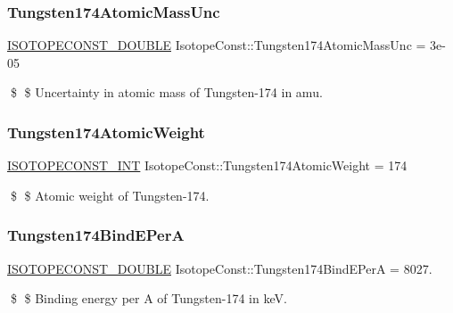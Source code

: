 \subsubsection{\texorpdfstring{Tungsten174\+Atomic\+Mass\+Unc}{Tungsten174AtomicMassUnc}}
{\footnotesize\ttfamily \mbox{\hyperlink{group___isotope_const-_macros_ga8f45a7272ce02c0b4c65c44636ed719a}{I\+S\+O\+T\+O\+P\+E\+C\+O\+N\+S\+T\+\_\+\+D\+O\+U\+B\+LE}} Isotope\+Const\+::\+Tungsten174\+Atomic\+Mass\+Unc = 3e-\/05}

\$ \$ Uncertainty in atomic mass of Tungsten-\/174 in amu. \mbox{\label{group___isotope_const-_tungsten-_w174_ga7711e9fd1b9ef472b4cac411e35f0bcd}} 
\subsubsection{\texorpdfstring{Tungsten174\+Atomic\+Weight}{Tungsten174AtomicWeight}}
{\footnotesize\ttfamily \mbox{\hyperlink{group___isotope_const-_macros_ga5f18360b3e99483a35c32d789e62621c}{I\+S\+O\+T\+O\+P\+E\+C\+O\+N\+S\+T\+\_\+\+I\+NT}} Isotope\+Const\+::\+Tungsten174\+Atomic\+Weight = 174}

\$ \$ Atomic weight of Tungsten-\/174. \mbox{\label{group___isotope_const-_tungsten-_w174_gad91877e5d20d198186859f89a08652f2}} 
\subsubsection{\texorpdfstring{Tungsten174\+Bind\+E\+PerA}{Tungsten174BindEPerA}}
{\footnotesize\ttfamily \mbox{\hyperlink{group___isotope_const-_macros_ga8f45a7272ce02c0b4c65c44636ed719a}{I\+S\+O\+T\+O\+P\+E\+C\+O\+N\+S\+T\+\_\+\+D\+O\+U\+B\+LE}} Isotope\+Const\+::\+Tungsten174\+Bind\+E\+PerA = 8027.}

\$ \$ Binding energy per A of Tungsten-\/174 in keV. \mbox{\label{group___isotope_const-_tungsten-_w174_ga3bdf0e6e66fc2b5237fecac10c411445}} 
